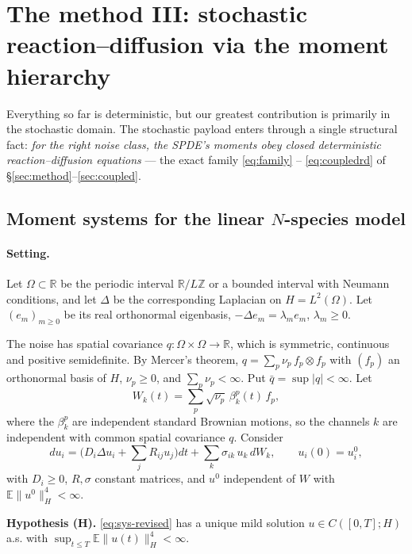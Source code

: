 \section{The method III: stochastic reaction--diffusion via the moment hierarchy}
\label{sec:stochastic}

Everything so far is deterministic, but our greatest contribution is primarily in the stochastic domain. The stochastic payload enters through a single structural fact: \emph{for the right noise class, the SPDE's moments obey closed deterministic reaction--diffusion equations} --- the exact family \eqref{eq:family} -- \eqref{eq:coupledrd} of \S\ref{sec:method}--\ref{sec:coupled}.

\subsection{Moment systems for the linear $N$-species model}


\paragraph{Setting.}
Let $\Omega\subset\mathbb{R}$ be the periodic interval $\mathbb{R}/L\mathbb{Z}$ or a bounded interval with Neumann conditions, and let $\Delta$ be the corresponding Laplacian on $H=L^2(\Omega)$. Let $(e_m)_{m\ge 0}$ be its real orthonormal eigenbasis, $-\Delta e_m=\lambda_m e_m$, $\lambda_m\ge 0$.
 
The noise has spatial covariance $q:\Omega\times\Omega\to\mathbb{R}$, which is symmetric, continuous and positive semidefinite. By Mercer's theorem, $q=\sum_p \nu_p\, f_p\otimes f_p$ with $(f_p)$ an orthonormal basis of $H$, $\nu_p\ge 0$, and $\sum_p\nu_p<\infty$. Put $\bar q=\sup|q|<\infty$. Let
\[
W_k(t)=\sum_p\sqrt{\nu_p}\,\beta_k^p(t)\,f_p ,
\]
where the $\beta_k^p$ are independent standard Brownian motions, so the channels $k$ are independent with common spatial covariance $q$. Consider
\begin{equation}\label{eq:sys-revised}
du_i=\Big(D_i\Delta u_i+\sum_j R_{ij}u_j\Big)dt+\sum_k\sigma_{ik}\,u_k\,dW_k,
\qquad u_i(0)=u_i^0,
\end{equation}
with $D_i\ge 0$, $R,\sigma$ constant matrices, and $u^0$ independent of $W$ with $\mathbb{E}\|u^0\|_H^4<\infty$.
 
\medskip
\noindent\textbf{Hypothesis (H).} \eqref{eq:sys-revised} has a unique mild solution $u\in C([0,T];H)$ a.s. with $\sup_{t\le T}\mathbb{E}\|u(t)\|_H^4<\infty$.
 
